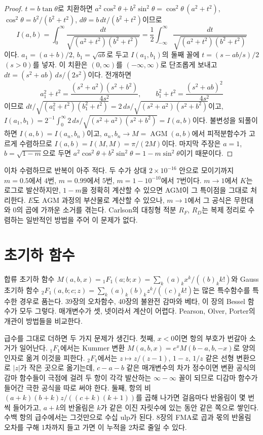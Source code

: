 \begin{proof}
$t=b\tan\theta$로 치환하면 $a^2\cos^2\theta+b^2\sin^2\theta=\cos^2\theta\,(a^2+t^2)$, $\cos^2\theta=b^2/(b^2+t^2)$, $d\theta=b\,dt/(b^2+t^2)$이므로
\[
I(a,b)=\int_0^\infty\frac{dt}{\sqrt{(a^2+t^2)(b^2+t^2)}}=\frac12\int_{-\infty}^\infty\frac{dt}{\sqrt{(a^2+t^2)(b^2+t^2)}}
\]
이다. $a_1=(a+b)/2$, $b_1=\sqrt{ab}$로 두고 $I(a_1,b_1)$의 둘째 꼴에 $t=(s-ab/s)/2$ $(s>0)$를 넣자. 이 치환은 $(0,\infty)$를 $(-\infty,\infty)$로 단조롭게 보내고 $dt=(s^2+ab)\,ds/(2s^2)$이다. 전개하면
\[
a_1^2+t^2=\frac{(s^2+a^2)(s^2+b^2)}{4s^2},\qquad b_1^2+t^2=\frac{(s^2+ab)^2}{4s^2}
\]
이므로 $dt/\sqrt{(a_1^2+t^2)(b_1^2+t^2)}=2\,ds/\sqrt{(s^2+a^2)(s^2+b^2)}$이고, $I(a_1,b_1)=2^{-1}\int_0^\infty2\,ds/\sqrt{(s^2+a^2)(s^2+b^2)}=I(a,b)$이다. 불변성을 되풀이하면 $I(a,b)=I(a_n,b_n)$이고, $a_n,b_n\to M=\operatorname{AGM}(a,b)$에서 피적분함수가 고르게 수렴하므로 $I(a,b)=I(M,M)=\pi/(2M)$이다. 마지막 주장은 $a=1$, $b=\sqrt{1-m}$으로 두면 $a^2\cos^2\theta+b^2\sin^2\theta=1-m\sin^2\theta$이기 때문이다\cite{cox1984agm,borwein1987pi}.
\end{proof}

이차 수렴하므로 반복이 아주 적다. 두 수가 상대 $2\times10^{-16}$ 안으로 모이기까지 $m=0.5$에서 $4$번, $m=0.99$에서 $5$번, $m=1-10^{-10}$에서 $7$번이다. $m\to1$에서 $K$는 로그로 발산하지만, $1-m$을 정확히 계산할 수 있으면 AGM이 그 특이점을 그대로 처리한다. $E$도 AGM 과정의 부산물로 계산할 수 있으나, $m\to1$에서 그 공식은 무한대와 $0$의 곱에 가까운 소거를 겪는다. Carlson의 대칭형 적분 $R_F$, $R_D$는 복제 정리로 수렴하는 일반적인 방법을 주어 이 문제가 없다\cite{carlson1995}.

\section{초기하 함수}
\label{sec:hypergeometric}

합류 초기하 함수 $M(a,b,x)={}_1F_1(a;b;x)=\sum_k(a)_kx^k/((b)_kk!)$와 Gauss 초기하 함수 ${}_2F_1(a,b;c;z)=\sum_k(a)_k(b)_kz^k/((c)_kk!)$는 많은 특수함수를 특수한 경우로 품는다. 39장의 오차함수, 40장의 불완전 감마와 베타, 이 장의 Bessel 함수가 모두 그렇다. 매개변수가 셋, 넷이라서 계산이 어렵다. Pearson, Olver, Porter의 개관이 방법들을 비교한다\cite{pearson2017hyp}.

급수를 그대로 더하면 두 가지 문제가 생긴다. 첫째, $x<0$이면 항의 부호가 번갈아 소거가 일어난다. ${}_1F_1$에서는 Kummer 변환 $M(a,b,x)=e^xM(b-a,b,-x)$로 양의 인자로 옮겨 이것을 피한다. ${}_2F_1$에서는 $z\mapsto z/(z-1)$, $1-z$, $1/z$ 같은 선형 변환으로 $|z|$가 작은 곳으로 옮기는데, $c-a-b$ 같은 매개변수의 차가 정수이면 변환 공식의 감마 함수들이 극점에 걸려 두 항이 각각 발산하는 $\infty-\infty$ 꼴이 되므로 디감마 함수가 들어간 극한 공식을 따로 써야 한다. 둘째, 항의 비 $(a+k)(b+k)z/((c+k)(k+1))$를 곱해 나가면 걸음마다 반올림이 몇 번씩 들어가고, $a+k$의 반올림은 $k$가 같은 이진 자릿수에 있는 동안 같은 쪽으로 쌓인다. 수백 항의 급수에서는 그것만으로 수십 ulp가 된다. 8장의 FMA로 곱과 몫의 반올림 오차를 구해 1차까지 들고 가면 이 누적을 2차로 줄일 수 있다.

